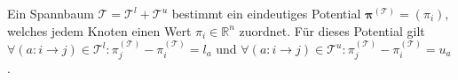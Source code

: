 \documentclass[accentcolor = tud11b, a4paper, 11pt, twocolumn]{scrartcl}
\newcommand{\R}{\ensuremath{\mathbb{R}}}
\renewcommand{\vec}[1]{\boldsymbol{\mathbf{#1}}}
\begin{document}
		Ein Spannbaum \( \mathcal{T} = \mathcal{T}^l + \mathcal{T}^u \) bestimmt ein eindeutiges Potential \( \vec{\pi}^{(\mathcal{T})} = (\pi_i) \), welches jedem Knoten einen Wert \( \pi_i \in \R^n \) zuordnet. Für dieses Potential gilt \( \forall (a : i \to j) \in \mathcal{T}^l : \pi^{(\mathcal{T})}_j - \pi^{(\mathcal{T})}_i = l_a \) und \( \forall (a : i \to j) \in \mathcal{T}^u : \pi^{(\mathcal{T})}_j - \pi^{(\mathcal{T})}_i = u_a \).
		


	
\end{document}
